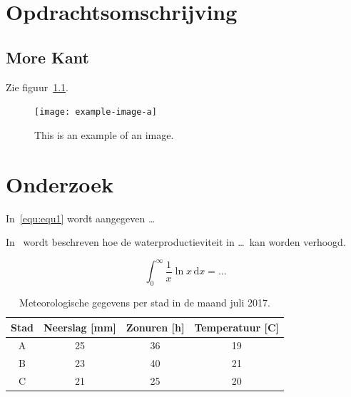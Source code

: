 \documentclass[a4paper,12pt]{book} %
\begin{document}
\chapter{Opdrachtsomschrijving}
\kant[7]
\section{More Kant}
\kant[8]

Zie figuur~\ref{fig:fig1}.

\begin{figure}[!ht]
\centering
\texttt{[image: example-image-a]}
\caption{This is an example of an image.}
\label{fig:fig1}
\end{figure}
\kant[9]

\chapter{Onderzoek}

\kant[1]
In~\eqref{equ:equ1} wordt aangegeven \ldots

In~\cite{oweis2003improving} wordt beschreven hoe de waterproductieviteit in \ldots\ kan worden verhoogd.

\begin{equation}
\label{equ:equ1}
\int_{0}^{\infty} \frac{1}{x}\ln x\, \mathrm{d}x = \ldots
\end{equation}

\begin{table}[!ht]
\centering
\caption{Meteorologische gegevens per stad in de maand juli 2017.}
\label{tab:my-table}
\begin{tabular}{@{}cccc@{}}
\toprule
Stad & Neerslag {[}mm{]} & Zonuren {[}h{]} & Temperatuur {[}C{]} \\ \midrule
A    & 25                & 36              & 19                  \\
B    & 23                & 40              & 21                  \\
C    & 21                & 25              & 20                  \\ \bottomrule
\end{tabular}
\end{table}

\backmatter


\end{document}

